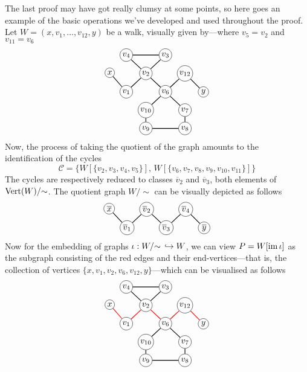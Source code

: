 The last proof may have got really clumsy at some points, so here goes an
example of the basic operations we've developed and used throughout the
proof. Let \(W = (x, v_1, \dots, v_{12}, y)\) be a walk, visually given
by---where \(v_5 = v_2\) and \(v_{11} = v_6\)
\[
    \begin{tikzcd}[%
            , cells={nodes={circle, draw, inner sep=1.5pt}}
            , every arrow/.append style={dash,thick}
            , row sep=tiny
            , column sep=tiny
        ]
        &v_4 \ar[rr] \ar[dr] & &v_3 \ar[dl] & &
        \\
        x \ar[dr] & &v_2 \ar[dl] \ar[dr] & &v_{12} \ar[dr] &
        \\
        &v_1 & &v_6 \ar[ur] \ar[dl] \ar[dr] & &y
        \\
        & &v_{10} \ar[d] & &v_7 \ar[d] &
        \\
        & &v_9 \ar[rr] & &v_8 &
    \end{tikzcd}
\]
Now, the process of taking the quotient of the graph amounts to the
identification of the cycles
\[
    \mathcal C = \{
    W[\{v_2, v_3, v_4, v_5\}],\,
    W[\{v_6, v_7, v_8, v_9, v_{10}, v_{11}\}]
    \}
\]
The cycles are respectively reduced to classes \(\overline v_2\) and \(\overline
v_3\), both elements of \(\operatorname{Vert}(W)/{\sim}\). The quotient graph \(W/{\sim}\) can be visually
depicted as follows
\[
    \begin{tikzcd}[%
            , cells={nodes={circle, draw, inner sep=1.5pt}}
            , every arrow/.append style={dash,thick}
            , row sep=tiny
            , column sep=tiny
        ]
        \overline x \ar[dr]
        & &\overline v_2 \ar[dl] \ar[dr] & &\overline v_4 \ar[dl] \ar[dr] &
        \\
        &\overline v_1 & &\overline v_3 & &\overline y
    \end{tikzcd}
\]
Now for the embedding of graphs \(\iota: W/{\sim}\, \hookrightarrow W\), we can view
\(P = W[\operatorname{im} \iota]\) as the subgraph consisting of the red edges and their
end-vertices---that is, the collection of vertices
\(\{x, v_1, v_2, v_6, v_{12}, y\}\)---which can be visualised as follows
\[
    \begin{tikzcd}[%
            , cells={nodes={circle, draw, inner sep=1.5pt}}
            , every arrow/.append style={dash,thick}
            , row sep=tiny
            , column sep=tiny
        ]
        &v_4 \ar[rr] \ar[dr] & &v_3 \ar[dl] & &
        \\
        x \ar[dr, color=red] & &v_2 \ar[dl, color=red] \ar[dr, color=red]
        & &v_{12} \ar[dr, color=red] &
        \\
        &v_1 & &v_6 \ar[ur, color=red] \ar[dl] \ar[dr] & &y
        \\
        & &v_{10} \ar[d] & &v_7 \ar[d] &
        \\
        & &v_9 \ar[rr] & &v_8 &
    \end{tikzcd}
\]


